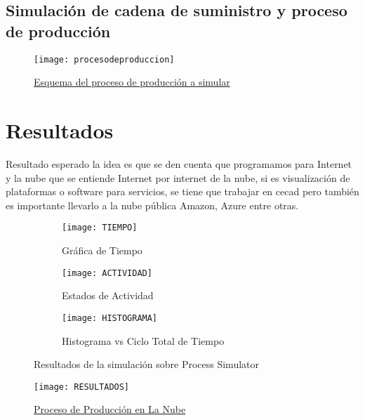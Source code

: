 \documentclass[10pt]{article}   			%
\begin{document}
\subsection{Simulación de cadena de suministro y proceso de producción}

\begin{figure}[ht] 
	\centering
		\texttt{[image: procesodeproduccion]}   
	\caption{ \href{https://youtu.be/TfvSbhoqySw}{Esquema del proceso de producción a simular}} \label{fig:procesodeproduccion}
\end{figure}

\newpage

\section{Resultados}

Resultado esperado la idea es que se den cuenta que programamos para Internet y la nube que se entiende Internet por internet de la nube, si es visualización de  plataformas o software para servicios, se tiene que trabajar en cecad pero también es importante llevarlo a la nube pública Amazon, Azure entre otras.

\begin{figure}[ht]
\centering
\begin{subfigure}[b]{0.45\textwidth}  		%
	\texttt{[image: TIEMPO]}
	\caption{Gráfica de Tiempo}
	\label{fig:TIEMPO}
\end{subfigure}
\begin{subfigure}[b]{0.4\textwidth}		 	%
	\texttt{[image: ACTIVIDAD]}
	\caption{Estados de Actividad}
	\label{fig:ACTIVIDAD}
\end{subfigure}
\begin{subfigure}[b]{0.74\textwidth}		 	%
	\texttt{[image: HISTOGRAMA]}
	\caption{Histograma vs Ciclo Total de Tiempo}
	\label{fig:HISTOGRAMA}
\end{subfigure}
\caption{Resultados de la simulación sobre Process Simulator}\label{fig:ResultadosProcessl.}
\end{figure}

\begin{figure}[ht] 
	\centering
		\texttt{[image: RESULTADOS]}   
	\caption{ \href{https://freeboard.io/board/U-EO0n}{Proceso de Producción en La Nube}} \label{fig:RESULTADOS}
\end{figure}
		
\end{document}
